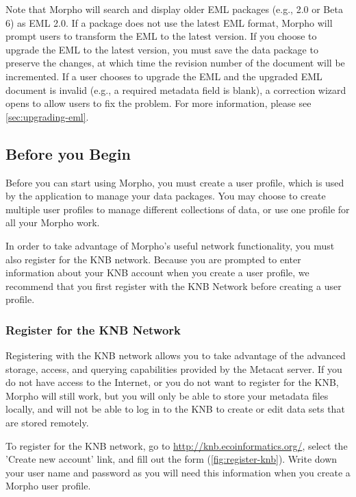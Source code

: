 Note that Morpho will search and display older EML packages (e.g., 2.0
or Beta 6) as EML 2.0. If a package does not use the latest EML format,
Morpho will prompt users to transform the EML to the latest version. If
you choose to upgrade the EML to the latest version, you must save the
data package to preserve the changes, at which time the revision number
of the document will be incremented. If a user chooses to upgrade the
EML and the upgraded EML document is invalid (e.g., a required metadata
field is blank), a correction wizard opens to allow users to fix the
problem. For more information, please see \autoref{sec:upgrading-eml}.

\subsection{Before you Begin} \label{sec:before-you-begin}

Before you can start using Morpho, you must create a user profile, which
is used by the application to manage your data packages. You may choose
to create multiple user profiles to manage different collections of
data, or use one profile for all your Morpho work. 

In order to take advantage of Morpho's useful network functionality, you
must also register for the KNB network.  Because you are prompted to
enter information about your KNB account when you create a user profile,
we recommend that you first register with the KNB Network before
creating a user profile.

\subsubsection{Register for the KNB Network} \label{sec:register}

Registering with the KNB network allows you to take advantage of the
advanced storage, access, and querying capabilities provided by the
Metacat server. If you do not have access to the Internet, or you do not
want to register for the KNB, Morpho will still work, but you will only
be able to store your metadata files locally, and will not be able to
log in to the KNB to create or edit data sets that are stored remotely.

To register for the KNB network, go to
\url{http://knb.ecoinformatics.org/}, select the 'Create new account'
link, and fill out the form (\autoref{fig:register-knb}). Write down
your user name and password as you will need this information when you
create a Morpho user profile.

